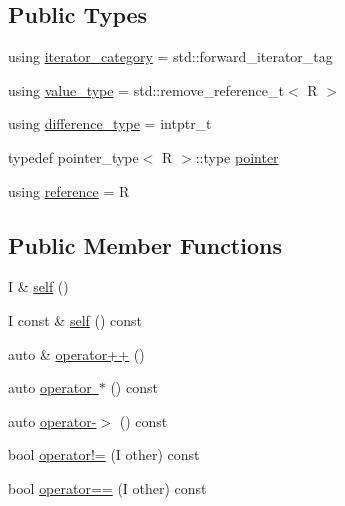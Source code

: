 \subsection*{Public Types}
\begin{DoxyCompactItemize}
\item 
using \mbox{\hyperlink{structrah_1_1iterator__facade_3_01_i_00_01_r_00_01std_1_1forward__iterator__tag_01_4_a3ed65491660beef4bd9488a3f511c934}{iterator\+\_\+category}} = std\+::forward\+\_\+iterator\+\_\+tag
\item 
using \mbox{\hyperlink{structrah_1_1iterator__facade_3_01_i_00_01_r_00_01std_1_1forward__iterator__tag_01_4_a95da65d8da6515cbd927873f565a9cdc}{value\+\_\+type}} = std\+::remove\+\_\+reference\+\_\+t$<$ R $>$
\item 
using \mbox{\hyperlink{structrah_1_1iterator__facade_3_01_i_00_01_r_00_01std_1_1forward__iterator__tag_01_4_a9f8ec957ea36b46eae3ca8bb89b6cf1c}{difference\+\_\+type}} = intptr\+\_\+t
\item 
typedef pointer\+\_\+type$<$ R $>$\+::type \mbox{\hyperlink{structrah_1_1iterator__facade_3_01_i_00_01_r_00_01std_1_1forward__iterator__tag_01_4_ae7253d3dac99a9b2bead5b6ea82ff2b1}{pointer}}
\item 
using \mbox{\hyperlink{structrah_1_1iterator__facade_3_01_i_00_01_r_00_01std_1_1forward__iterator__tag_01_4_a19aa13e142ee687a3f9dd672d68a25c7}{reference}} = R
\end{DoxyCompactItemize}
\subsection*{Public Member Functions}
\begin{DoxyCompactItemize}
\item 
I \& \mbox{\hyperlink{structrah_1_1iterator__facade_3_01_i_00_01_r_00_01std_1_1forward__iterator__tag_01_4_a251df6fed6851bf7c6e5a37943d2bbdb}{self}} ()
\item 
I const  \& \mbox{\hyperlink{structrah_1_1iterator__facade_3_01_i_00_01_r_00_01std_1_1forward__iterator__tag_01_4_ab4e8c072a2c2058660886dba347b0e78}{self}} () const
\item 
auto \& \mbox{\hyperlink{structrah_1_1iterator__facade_3_01_i_00_01_r_00_01std_1_1forward__iterator__tag_01_4_a12486875e5b6fb93363408b9680dba64}{operator++}} ()
\item 
auto \mbox{\hyperlink{structrah_1_1iterator__facade_3_01_i_00_01_r_00_01std_1_1forward__iterator__tag_01_4_abd064784607e07a4fd444ce8ceb224ab}{operator $\ast$}} () const
\item 
auto \mbox{\hyperlink{structrah_1_1iterator__facade_3_01_i_00_01_r_00_01std_1_1forward__iterator__tag_01_4_a1fedf1529cf892522c1a73169b10936a}{operator-\/$>$}} () const
\item 
bool \mbox{\hyperlink{structrah_1_1iterator__facade_3_01_i_00_01_r_00_01std_1_1forward__iterator__tag_01_4_ae6487405e0a877ee7c9e9fb6a27d7158}{operator!=}} (I other) const
\item 
bool \mbox{\hyperlink{structrah_1_1iterator__facade_3_01_i_00_01_r_00_01std_1_1forward__iterator__tag_01_4_a3800bc53c7e3d504836bd9b125ae4600}{operator==}} (I other) const
\end{DoxyCompactItemize}


